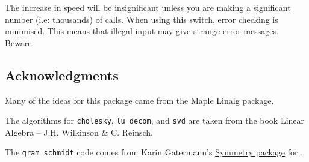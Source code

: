 {The increase in speed will be insignificant unless you are making a
significant number (i.e: thousands) of calls. When using this switch,
error checking is minimised. This means that illegal input may give
strange error messages. Beware.

\fi


\subsection{Acknowledgments}

Many of the ideas for this package came from the Maple Linalg package.

The algorithms for \texttt{cholesky}, \texttt{lu\_decom}, and
\texttt{svd} are taken from the book Linear Algebra -- J.H. Wilkinson
\& C. Reinsch.

The \texttt{gram\_schmidt} code comes from Karin Gatermann's
\hyperref[package:SYMMETRY]{Symmetry package} for {\REDUCE}.
}

